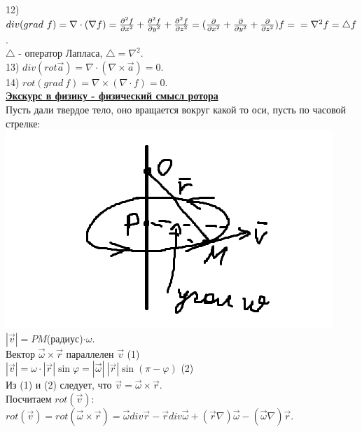 \documentclass[12pt]{article}
\begin{document}
12) $div (grad \ f) = \nabla \cdot ({\nabla f}) = \frac{\partial^2 f}{\partial x^2} + \frac{\partial^2 f}{\partial y^2} + \frac{\partial^2 f}{\partial z^2} = (\frac{\partial}{\partial x^2} + \frac{\partial}{\partial y^2} + \frac{\partial}{\partial z^2})f =\\= \nabla^2 f = \bigtriangleup f$.\\
$\bigtriangleup$ - оператор Лапласа, $\bigtriangleup = \nabla^2$.\\
13) $div (rot \overrightarrow{a}) = \nabla \cdot (\nabla \times \overrightarrow{a}) = 0$.\\
14) $rot (grad \ f) = \nabla \times (\nabla \cdot f) = 0$.\\
\textbf{\uline{Экскурс в физику - физический смысл ротора}}\\
Пусть дали твердое тело, оно вращается вокруг какой то оси, пусть по часовой стрелке:\\
\includegraphics{rotorPhysicDefinition}\\
$|\overrightarrow{v}| = PM$(радиус)$\cdot \omega$.\\
Вектор $\overrightarrow{\omega} \times \overrightarrow{r}$ параллелен $\overrightarrow{v}$ (1)\\
$|\overrightarrow{v}| = \omega \cdot |\overrightarrow{r}| \sin \varphi = |\overrightarrow{\omega}| \ |\overrightarrow{r}| \sin (\pi - \varphi)$ (2)\\
Из (1) и (2) следует, что $\overrightarrow{v} = \overrightarrow{\omega} \times \overrightarrow{r}$.\\
Посчитаем $rot (\overrightarrow{v})$:\\
$rot(\overrightarrow{v})=rot(\overrightarrow{\omega} \times \overrightarrow{r}) = \overrightarrow{\omega} div \overrightarrow{r} - \overrightarrow{r} div \overrightarrow{\omega} + (\overrightarrow{r} \nabla) \overrightarrow{\omega} - (\overrightarrow{\omega} \nabla) \overrightarrow{r}$.\\
\end{document}
